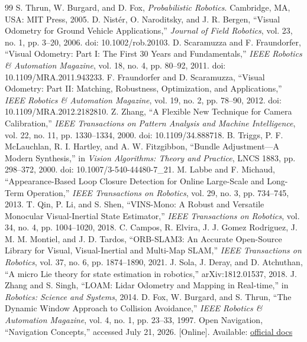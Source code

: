 \begin{thebibliography}{99}
 S. Thrun, W. Burgard, and D. Fox, \emph{Probabilistic Robotics}. Cambridge, MA, USA: MIT Press, 2005.
 D. Nist\'er, O. Naroditsky, and J. R. Bergen, ``Visual Odometry for Ground Vehicle Applications,'' \emph{Journal of Field Robotics}, vol. 23, no. 1, pp. 3--20, 2006. doi: 10.1002/rob.20103.
 D. Scaramuzza and F. Fraundorfer, ``Visual Odometry: Part I: The First 30 Years and Fundamentals,'' \emph{IEEE Robotics \& Automation Magazine}, vol. 18, no. 4, pp. 80--92, 2011. doi: 10.1109/MRA.2011.943233.
 F. Fraundorfer and D. Scaramuzza, ``Visual Odometry: Part II: Matching, Robustness, Optimization, and Applications,'' \emph{IEEE Robotics \& Automation Magazine}, vol. 19, no. 2, pp. 78--90, 2012. doi: 10.1109/MRA.2012.2182810.
 Z. Zhang, ``A Flexible New Technique for Camera Calibration,'' \emph{IEEE Transactions on Pattern Analysis and Machine Intelligence}, vol. 22, no. 11, pp. 1330--1334, 2000. doi: 10.1109/34.888718.
 B. Triggs, P. F. McLauchlan, R. I. Hartley, and A. W. Fitzgibbon, ``Bundle Adjustment---A Modern Synthesis,'' in \emph{Vision Algorithms: Theory and Practice}, LNCS 1883, pp. 298--372, 2000. doi: 10.1007/3-540-44480-7\_21.
 M. Labbe and F. Michaud, ``Appearance-Based Loop Closure Detection for Online Large-Scale and Long-Term Operation,'' \emph{IEEE Transactions on Robotics}, vol. 29, no. 3, pp. 734--745, 2013.
 T. Qin, P. Li, and S. Shen, ``VINS-Mono: A Robust and Versatile Monocular Visual-Inertial State Estimator,'' \emph{IEEE Transactions on Robotics}, vol. 34, no. 4, pp. 1004--1020, 2018.
 C. Campos, R. Elvira, J. J. Gomez Rodriguez, J. M. M. Montiel, and J. D. Tardos, ``ORB-SLAM3: An Accurate Open-Source Library for Visual, Visual-Inertial and Multi-Map SLAM,'' \emph{IEEE Transactions on Robotics}, vol. 37, no. 6, pp. 1874--1890, 2021.
 J. Sola, J. Deray, and D. Atchuthan, ``A micro Lie theory for state estimation in robotics,'' arXiv:1812.01537, 2018.
 J. Zhang and S. Singh, ``LOAM: Lidar Odometry and Mapping in Real-time,'' in \emph{Robotics: Science and Systems}, 2014.
 D. Fox, W. Burgard, and S. Thrun, ``The Dynamic Window Approach to Collision Avoidance,'' \emph{IEEE Robotics \& Automation Magazine}, vol. 4, no. 1, pp. 23--33, 1997.
 Open Navigation, ``Navigation Concepts,'' accessed July 21, 2026. [Online]. Available: \href{https://docs.nav2.org/concepts/index.html}{official docs}

\end{thebibliography}

